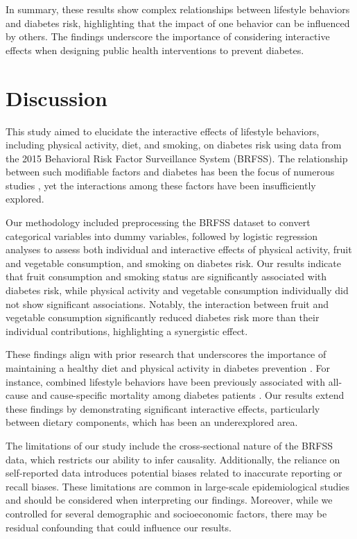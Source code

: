 \documentclass[11pt]{article}
\begin{document}
In summary, these results show complex relationships between lifestyle behaviors and diabetes risk, highlighting that the impact of one behavior can be influenced by others. The findings underscore the importance of considering interactive effects when designing public health interventions to prevent diabetes.

\section*{Discussion}

This study aimed to elucidate the interactive effects of lifestyle behaviors, including physical activity, diet, and smoking, on diabetes risk using data from the 2015 Behavioral Risk Factor Surveillance System (BRFSS). The relationship between such modifiable factors and diabetes has been the focus of numerous studies \cite{Astrup2001HealthyLI, Shi2013PhysicalAS}, yet the interactions among these factors have been insufficiently explored. 

Our methodology included preprocessing the BRFSS dataset to convert categorical variables into dummy variables, followed by logistic regression analyses to assess both individual and interactive effects of physical activity, fruit and vegetable consumption, and smoking on diabetes risk. Our results indicate that fruit consumption and smoking status are significantly associated with diabetes risk, while physical activity and vegetable consumption individually did not show significant associations. Notably, the interaction between fruit and vegetable consumption significantly reduced diabetes risk more than their individual contributions, highlighting a synergistic effect.

These findings align with prior research that underscores the importance of maintaining a healthy diet and physical activity in diabetes prevention \cite{Grossman2017BehavioralCT}. For instance, combined lifestyle behaviors have been previously associated with all-cause and cause-specific mortality among diabetes patients \cite{Lin2011ImpactOL, Han2021AssociationOA}. Our results extend these findings by demonstrating significant interactive effects, particularly between dietary components, which has been an underexplored area.

The limitations of our study include the cross-sectional nature of the BRFSS data, which restricts our ability to infer causality. Additionally, the reliance on self-reported data introduces potential biases related to inaccurate reporting or recall biases. These limitations are common in large-scale epidemiological studies and should be considered when interpreting our findings. Moreover, while we controlled for several demographic and socioeconomic factors, there may be residual confounding that could influence our results.
\end{document}
